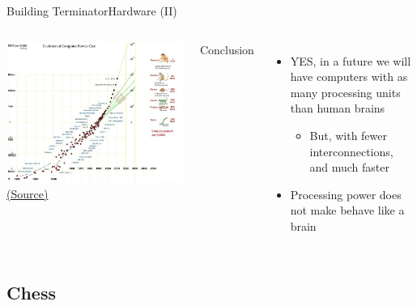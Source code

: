 \documentclass[10pt,compress]{beamer} %
\begin{document}
\begin{frame}{Building Terminator}{Hardware (II)}
	\begin{columns}
	\begin{center}
		\includegraphics[width=\linewidth]{figs/power.jpg}\\
		\tiny{\href{http://www.sjef.nu/a-basic-introduction-to-singularity-skepticism/}{(Source)}}
	\end{center}
	Conclusion
	\begin{itemize}
		\item YES, in a future we will have computers with as many processing units than human brains
		\begin{itemize}
		\item But, with fewer interconnections, and much faster
		\end{itemize}
		\item Processing power does not make behave like a brain
	\end{itemize}
	\end{columns}
\end{frame}

\subsection{Chess}
\end{document}
